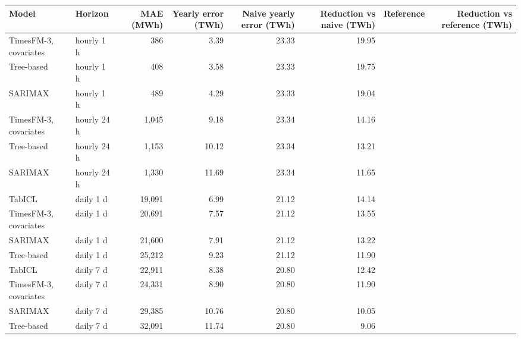 \begin{tabular}{llrrrrlr}
\toprule
Model & Horizon & MAE (MWh) & Yearly error (TWh) & Naive yearly error (TWh) & Reduction vs naive (TWh) & Reference & Reduction vs reference (TWh) \\
\midrule
TimesFM-3, covariates & hourly 1 h & 386 & 3.39 & 23.33 & 19.95 &  &  \\
Tree-based & hourly 1 h & 408 & 3.58 & 23.33 & 19.75 &  &  \\
SARIMAX & hourly 1 h & 489 & 4.29 & 23.33 & 19.04 &  &  \\
TimesFM-3, covariates & hourly 24 h & 1,045 & 9.18 & 23.34 & 14.16 &  &  \\
Tree-based & hourly 24 h & 1,153 & 10.12 & 23.34 & 13.21 &  &  \\
SARIMAX & hourly 24 h & 1,330 & 11.69 & 23.34 & 11.65 &  &  \\
TabICL & daily 1 d & 19,091 & 6.99 & 21.12 & 14.14 &  &  \\
TimesFM-3, covariates & daily 1 d & 20,691 & 7.57 & 21.12 & 13.55 &  &  \\
SARIMAX & daily 1 d & 21,600 & 7.91 & 21.12 & 13.22 &  &  \\
Tree-based & daily 1 d & 25,212 & 9.23 & 21.12 & 11.90 &  &  \\
TabICL & daily 7 d & 22,911 & 8.38 & 20.80 & 12.42 &  &  \\
TimesFM-3, covariates & daily 7 d & 24,331 & 8.90 & 20.80 & 11.90 &  &  \\
SARIMAX & daily 7 d & 29,385 & 10.76 & 20.80 & 10.05 &  &  \\
Tree-based & daily 7 d & 32,091 & 11.74 & 20.80 & 9.06 &  &  \\
\bottomrule
\end{tabular}
